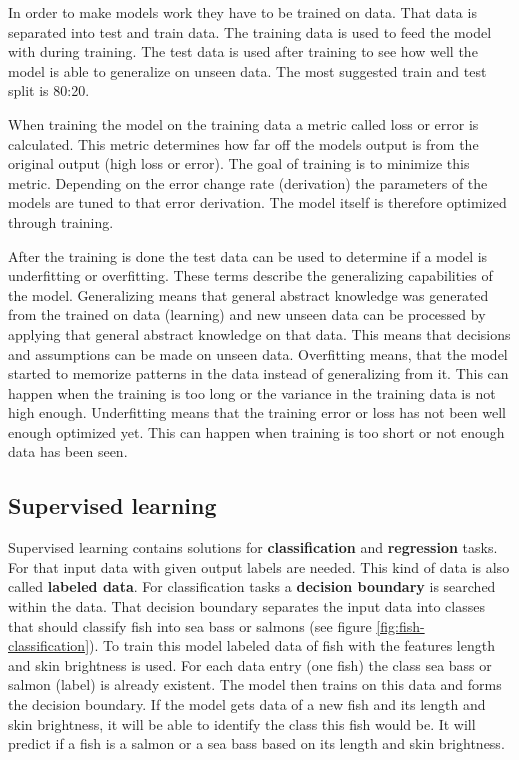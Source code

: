 \documentclass[jou,apacite]{apa6}
\begin{document}
In order to make models work they have to be trained on data. That data is separated into test and train data. The training data is used to feed the model with during training. The test data is used after training to see how well the model is able to generalize on unseen data. The most suggested train and test split is 80:20.

When training the model on the training data a metric called loss or error is calculated. This metric determines how far off the models output is from the original output (high loss or error). The goal of training is to minimize this metric. Depending on the error change rate (derivation) the parameters of the models are tuned to that error derivation. The model itself is therefore optimized through training.

After the training is done the test data can be used to determine if a model is underfitting or overfitting. These terms describe the generalizing capabilities of the model. Generalizing means that general abstract knowledge was generated from the trained on data (learning) and new unseen data can be processed by applying that general abstract knowledge on that data. This means that decisions and assumptions can be made on unseen data. Overfitting means, that the model started to memorize patterns in the data instead of generalizing from it. This can happen when the training is too long or the variance in the training data is not high enough. Underfitting means that the training error or loss has not been well enough optimized yet. This can happen when training is too short or not enough data has been seen.

\subsection{Supervised learning}
Supervised learning contains solutions for \textbf{classification} and \textbf{regression} tasks. For that input data with given output labels are needed. This kind of data is also called \textbf{labeled data}. For classification tasks a \textbf{decision boundary} is searched within the data. That decision boundary separates the input data into classes that should classify fish into sea bass or salmons (see figure \ref{fig:fish-classification}). To train this model labeled data of fish with the features length and skin brightness is used. For each data entry (one fish) the class sea bass or salmon (label) is already existent. The model then trains on this data and forms the decision boundary. If the model gets data of a new fish and its length and skin brightness, it will be able to identify the class this fish would be. It will predict if a fish is a salmon or a sea bass based on its length and skin brightness.
\end{document}
